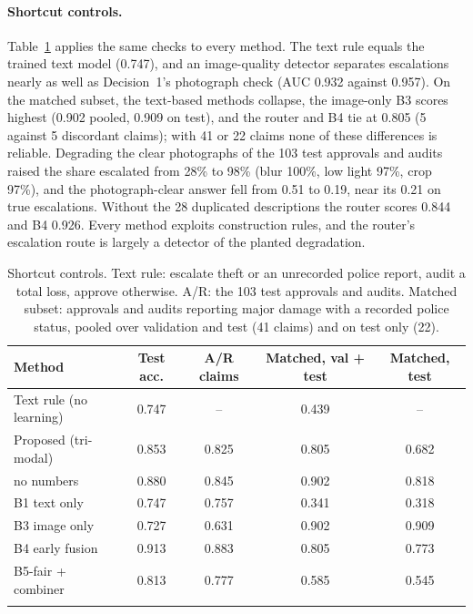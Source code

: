 \paragraph{Shortcut controls.}\label{sec:shortcuts}
Table~\ref{tab:short} applies the same checks to every method. The text rule equals the trained text model (0.747), and an image-quality detector separates escalations nearly as well as Decision~1's photograph check (AUC 0.932 against 0.957). On the matched subset, the text-based methods collapse, the image-only B3 scores highest (0.902 pooled, 0.909 on test), and the router and B4 tie at 0.805 (5 against 5 discordant claims); with 41 or 22 claims none of these differences is reliable. Degrading the clear photographs of the 103 test approvals and audits raised the share escalated from 28\% to 98\% (blur 100\%, low light 97\%, crop 97\%), and the photograph-clear answer fell from 0.51 to 0.19, near its 0.21 on true escalations. Without the 28 duplicated descriptions the router scores 0.844 and B4 0.926. Every method exploits construction rules, and the router's escalation route is largely a detector of the planted degradation.

\begin{table}[!htb]
\caption{Shortcut controls. Text rule: escalate theft or an unrecorded police report, audit a total loss, approve otherwise. A/R: the 103 test approvals and audits. Matched subset: approvals and audits reporting major damage with a recorded police status, pooled over validation and test (41 claims) and on test only (22).}\label{tab:short}
\footnotesize
\begin{tabular*}{\textwidth}{@{\extracolsep{\fill}}lcccc@{}}
\toprule
Method & Test acc. & A/R claims & Matched, val + test & Matched, test \\
\midrule
Text rule (no learning) & 0.747 & -- & 0.439 & -- \\
Proposed (tri-modal) & 0.853 & 0.825 & 0.805 & 0.682 \\
\quad no numbers & 0.880 & 0.845 & 0.902 & 0.818 \\
B1 text only & 0.747 & 0.757 & 0.341 & 0.318 \\
B3 image only & 0.727 & 0.631 & 0.902 & 0.909 \\
B4 early fusion & 0.913 & 0.883 & 0.805 & 0.773 \\
B5-fair + combiner & 0.813 & 0.777 & 0.585 & 0.545 \\
\botrule
\end{tabular*}
\end{table}

